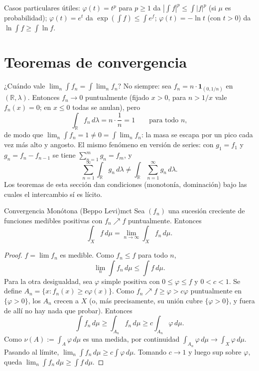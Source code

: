 \documentclass[11pt, a4paper]{article}
\begin{document}
\obs Casos particulares útiles: $\varphi(t) = t^p$ para $p \ge 1$ da $|\int f|^p \le \int |f|^p$ (si
$\mu$ es probabilidad); $\varphi(t) = e^t$ da $\exp(\int f) \le \int e^f$; $\varphi(t) = -\ln t$
(con $t > 0$) da $\ln \int f \ge \int \ln f$.

\newpage

\section{Teoremas de convergencia}

¿Cuándo vale $\lim_n \int f_n = \int \lim_n f_n$? No siempre: sea $f_n = n \cdot
\mathbf{1}_{(0, 1/n)}$ en $(\mathbb{R}, \lambda)$. Entonces $f_n \to 0$ puntualmente (fijado
$x > 0$, para $n > 1/x$ vale $f_n(x) = 0$; en $x \le 0$ todas se anulan), pero
$$ \int_{\mathbb{R}} f_n \, d\lambda = n \cdot \frac{1}{n} = 1 \qquad \text{para todo } n, $$
de modo que $\lim_n \int f_n = 1 \ne 0 = \int \lim_n f_n$: la masa se escapa por un pico cada
vez más alto y angosto. El mismo fenómeno en versión de series: con $g_1 = f_1$ y
$g_n = f_n - f_{n-1}$ se tiene $\sum_{n=1}^m g_n = f_m$, y
$$ \sum_{n=1}^\infty \int_{\mathbb{R}} g_n \, d\lambda \ne \int_{\mathbb{R}}
\sum_{n=1}^\infty g_n \, d\lambda. $$
Los teoremas de esta sección dan condiciones (monotonía, dominación) bajo las cuales el
intercambio sí es lícito.

\begin{teorema}{Convergencia Monótona (Beppo Levi)}{mct}
Sea $(f_n)$ una sucesión creciente de funciones medibles positivas con $f_n \nearrow f$
puntualmente. Entonces
$$ \int_X f \, d\mu = \lim_{n \to \infty} \int_X f_n \, d\mu. $$
\end{teorema}

\begin{proof}
$f = \lim f_n$ es medible. Como $f_n \le f$ para todo $n$,
$$ \lim_n \int f_n \, d\mu \le \int f \, d\mu. $$
Para la otra desigualdad, sea $\varphi$ simple positiva con $0 \le \varphi \le f$ y $0 < c < 1$.
Se define $A_n = \{x : f_n(x) \ge c \varphi(x)\}$. Como $f_n \nearrow f \ge \varphi > c\varphi$
puntualmente en $\{\varphi > 0\}$, los $A_n$ crecen a $X$ (o, más precisamente, su unión cubre
$\{\varphi > 0\}$, y fuera de allí no hay nada que probar). Entonces
$$ \int f_n \, d\mu \ge \int_{A_n} f_n \, d\mu \ge c \int_{A_n} \varphi \, d\mu. $$
Como $\nu(A) := \int_A \varphi \, d\mu$ es una medida, por continuidad
$\int_{A_n} \varphi \, d\mu \to \int_X \varphi \, d\mu$. Pasando al límite,
$\lim_n \int f_n \, d\mu \ge c \int \varphi \, d\mu$. Tomando $c \to 1$ y luego sup sobre $\varphi$,
queda $\lim_n \int f_n \, d\mu \ge \int f \, d\mu$.
\end{proof}
\end{document}
